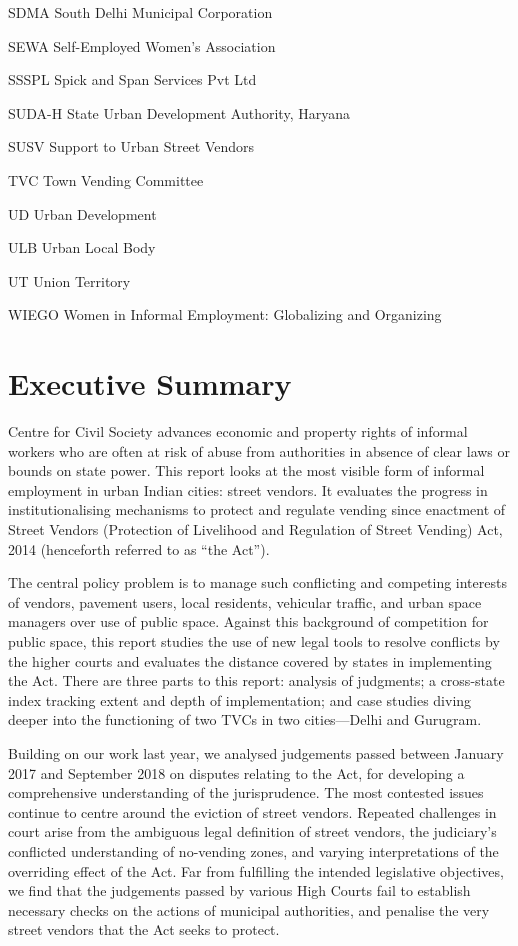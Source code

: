 \documentclass[a4paper, 12pt, twoside]{article}
\begin{document}
\begin{abbrv}
	\item[SDMA]			South Delhi Municipal Corporation
	\item[SEWA]			Self-Employed Women's Association
	\item[SSSPL]			Spick and Span Services Pvt Ltd
	\item[SUDA-H]			State Urban Development Authority, Haryana
	\item[SUSV]			Support to Urban Street Vendors
	\item[TVC]			Town Vending Committee
	\item[UD]				Urban Development
	\item[ULB]				Urban Local Body
	\item[UT]				Union Territory
	\item[WIEGO]			Women in Informal Employment: Globalizing and Organizing
\end{abbrv}

\newpage
\section*{Executive Summary}


Centre for Civil Society advances economic and property rights of informal workers who are often at risk of abuse from authorities in absence of clear laws or bounds on state power. This report looks at the most visible form of informal employment in urban Indian cities: street vendors. It evaluates the progress in institutionalising mechanisms to protect and regulate vending since enactment of Street Vendors (Protection of Livelihood and Regulation of Street Vending) Act, 2014 (henceforth referred to as “the Act”).


The central policy problem is to manage such conflicting and competing interests of vendors, pavement users, local residents, vehicular traffic, and urban space managers over use of public space. Against this background of competition for public space, this report studies the use of new legal tools to resolve conflicts by the higher courts and evaluates the distance covered by states in implementing the Act. There are three parts to this report: analysis of judgments; a cross-state index tracking extent and depth of implementation; and case studies diving deeper into the functioning of two TVCs in two cities—Delhi and Gurugram.

Building on our work last year, we analysed judgements passed between January 2017 and September 2018 on disputes relating to the Act,  for developing a comprehensive understanding of the jurisprudence. The most contested issues continue to centre around the eviction of street vendors. Repeated challenges in court arise from the ambiguous legal definition of street vendors, the judiciary's conflicted understanding of no-vending zones, and varying interpretations of the overriding effect of the Act. Far from fulfilling the intended legislative objectives, we find that the judgements passed by various High Courts fail to establish necessary checks on the actions of municipal authorities, and penalise the very street vendors that the Act seeks to protect.
\end{document}
